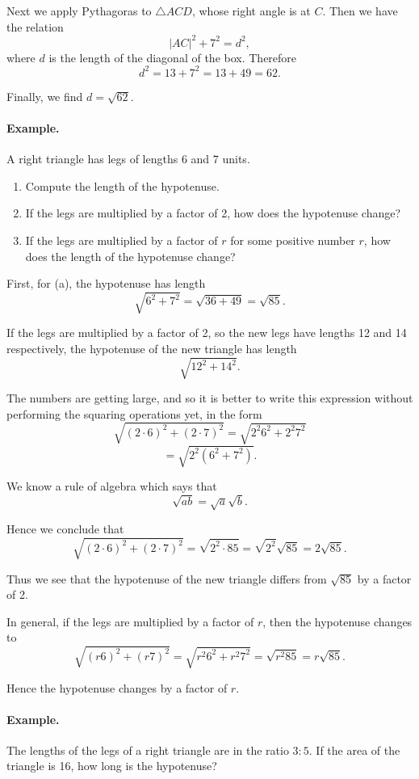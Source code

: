 \documentclass[12pt]{book} %
\begin{document}
Next we apply Pythagoras to $\triangle ACD$, whose right angle is at $C$. Then we have the relation
\[
|AC|^2+7^2=d^2,
\]
where $d$ is the length of the diagonal of the box. Therefore
\[
d^2=13+7^2=13+49=62.
\]

Finally, we find $d=\sqrt{62}$.

\paragraph{Example.}
A right triangle has legs of lengths 6 and 7 units.
\begin{enumerate}
\item[(a)] Compute the length of the hypotenuse.
\item[(b)] If the legs are multiplied by a factor of 2, how does the hypotenuse change?
\item[(c)] If the legs are multiplied by a factor of $r$ for some positive number $r$, how does the length of the hypotenuse change?
\end{enumerate}

First, for (a), the hypotenuse has length
\[
\sqrt{6^2+7^2}=\sqrt{36+49}=\sqrt{85}.
\]

If the legs are multiplied by a factor of 2, so the new legs have lengths 12 and 14 respectively, the hypotenuse of the new triangle has length
\[
\sqrt{12^2+14^2}.
\]

The numbers are getting large, and so it is better to write this expression without performing the squaring operations yet, in the form
\[
\sqrt{(2\cdot 6)^2+(2\cdot 7)^2}=\sqrt{2^2 6^2+2^2 7^2}
\]
\[
=\sqrt{2^2(6^2+7^2)}.
\]

We know a rule of algebra which says that
\[
\sqrt{ab}=\sqrt{a}\sqrt{b}.
\]

Hence we conclude that
\[
\sqrt{(2\cdot 6)^2+(2\cdot 7)^2}=\sqrt{2^2\cdot 85}=\sqrt{2^2}\sqrt{85}=2\sqrt{85}.
\]

Thus we see that the hypotenuse of the new triangle differs from $\sqrt{85}$ by a factor of 2.

In general, if the legs are multiplied by a factor of $r$, then the hypotenuse changes to
\[
\sqrt{(r6)^2+(r7)^2}=\sqrt{r^2 6^2+r^2 7^2}=\sqrt{r^2 85}=r\sqrt{85}.
\]

Hence the hypotenuse changes by a factor of $r$.

\paragraph{Example.}
The lengths of the legs of a right triangle are in the ratio $3:5$. If the area of the triangle is 16, how long is the hypotenuse?
\end{document}
